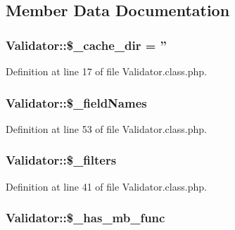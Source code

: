 \subsection{Member Data Documentation}
\hypertarget{classValidator_aaba7f33304aedded2c308120a0925e77}{
\subsubsection[{\$\-\_\-cache\-\_\-dir}]{\setlength{\rightskip}{0pt plus 5cm}Validator\-::\$\-\_\-cache\-\_\-dir = ''}}\label{classValidator_aaba7f33304aedded2c308120a0925e77}


Definition at line 17 of file Validator.\-class.\-php.

\hypertarget{classValidator_a5689ec4c9687c826fc82902fa9b662d8}{
\subsubsection[{\$\-\_\-field\-Names}]{\setlength{\rightskip}{0pt plus 5cm}Validator\-::\$\-\_\-field\-Names}}\label{classValidator_a5689ec4c9687c826fc82902fa9b662d8}


Definition at line 53 of file Validator.\-class.\-php.

\hypertarget{classValidator_ab86eb87cb828002c10d06be613d7b013}{
\subsubsection[{\$\-\_\-filters}]{\setlength{\rightskip}{0pt plus 5cm}Validator\-::\$\-\_\-filters}}\label{classValidator_ab86eb87cb828002c10d06be613d7b013}


Definition at line 41 of file Validator.\-class.\-php.

\hypertarget{classValidator_a8ac5ee1cf7a5ba237ee40c61a5d834c1}{
\subsubsection[{\$\-\_\-has\-\_\-mb\-\_\-func}]{\setlength{\rightskip}{0pt plus 5cm}Validator\-::\$\-\_\-has\-\_\-mb\-\_\-func}}\label{classValidator_a8ac5ee1cf7a5ba237ee40c61a5d834c1}


